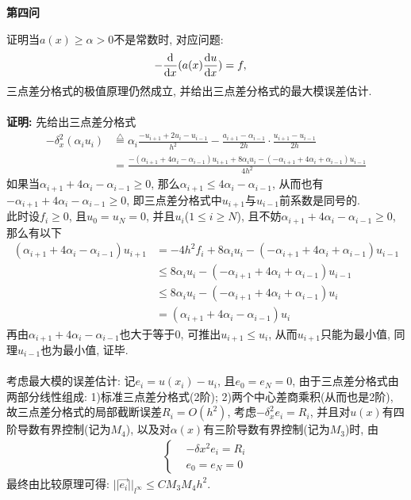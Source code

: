 \documentclass[12pt]{article}
\begin{document}
\begin{center}
	\textbf{第四问}
\end{center}
\noindent 证明当$a(x)\ge \alpha >0$不是常数时, 对应问题:
\begin{align*}
	-\frac{{\rm d}}{{\rm d}x}(a(x)\frac{{\rm d}u}{{\rm d}x})&=f,
\end{align*}
\noindent 三点差分格式的极值原理仍然成立, 并给出三点差分格式的最大模误差估计.\\
\quad \\
\textbf{证明:} 先给出三点差分格式
\begin{align*}
	-\delta_{x}^2(\alpha_i u_i)&\overset{\triangle}{=}\alpha_i\frac{-u_{i+1}+2u_i-u_{i-1}}{h^2}-\frac{a_{i+1}-\alpha_{i-1}}{2h}\cdot\frac{u_{i+1}-u_{i-1}}{2h}\\
	&=\frac{-(\alpha_{i+1}+4\alpha_i-\alpha_{i-1})u_{i+1}+8\alpha_i u_i-(-\alpha_{i+1}+4\alpha_i+\alpha_{i-1})u_{i-1}}{4h^2}
\end{align*}
\noindent 如果当$\alpha_{i+1}+4\alpha_i-\alpha_{i-1}\ge0$, 那么$\alpha_{i+1}\le 4\alpha_i-\alpha_{i-1}$, 从而也有$-\alpha_{i+1}+4\alpha_i-\alpha_{i-1}\ge0$, 即三点差分格式中$u_{i+1}$与$u_{i-1}$前系数是同号的.\\
此时设$f_i\ge0$, 且$u_0=u_N=0$, 并且$u_i$($1\le i \ge N$), 且不妨$\alpha_{i+1}+4\alpha_i-\alpha_{i-1}\ge0$, 那么有以下
\begin{align*}
	(\alpha_{i+1}+4\alpha_i-\alpha_{i-1})u_{i+1}&=-4h^2 f_i+8\alpha_i u_i -(-\alpha_{i+1}+4\alpha_i+\alpha_{i-1})u_{i-1}\\
	&\le 8\alpha_i u_i -(-\alpha_{i+1}+4\alpha_i+\alpha_{i-1})u_{i-1}\\
	&\le  8\alpha_i u_i -(-\alpha_{i+1}+4\alpha_i+\alpha_{i-1})u_{i}\\
	&=(\alpha_{i+1}+4\alpha_i-\alpha_{i-1})u_{i}
\end{align*}
\noindent 再由$\alpha_{i+1}+4\alpha_i-\alpha_{i-1}$也大于等于$0$, 可推出$u_{i+1}\le u_i$, 从而$u_{i+1}$只能为最小值, 同理$u_{i-1}$也为最小值, 证毕.\\
\quad \\
\noindent 考虑最大模的误差估计: 记$e_i=u(x_i)-u_i$, 且$e_0=e_N=0$, 由于三点差分格式由两部分线性组成: 1)标准三点差分格式(2阶); 2)两个中心差商乘积(从而也是2阶), 故三点差分格式的局部截断误差$R_i=O(h^2)$, 考虑$	-\delta_{x}^2e_i=R_i$, 并且对$u(x)$有四阶导数有界控制(记为$M_4$), 以及对$\alpha(x)$有三阶导数有界控制(记为$M_3$)时, 由
\begin{align*}
	\begin{cases}
		&-\delta{x}^2 e_i =R_i\\
		&e_0=e_N=0
	\end{cases}
\end{align*}
\noindent 最终由比较原理可得: $\vert \vert \overset{\rightarrow}{e_i} \vert \vert_{l^{\infty}}\le CM_3M_4h^2 $.
\end{document}
